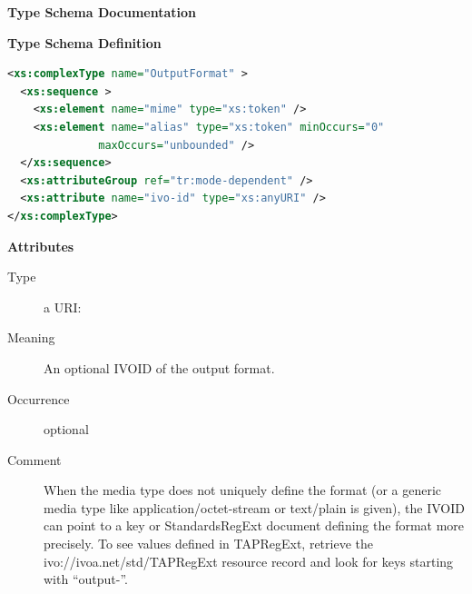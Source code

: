 \documentclass{ivoa}
\begin{document}
\begin{generated}
\begingroup
        \renewcommand*\descriptionlabel[1]{%
        \hbox to 5.5em{\emph{#1}\hfil}}\vspace{2ex}\noindent\textbf{ Type Schema Documentation}



\vspace{1ex}\noindent\textbf{ Type Schema Definition}

\begin{lstlisting}[language=XML,basicstyle=\footnotesize]
<xs:complexType name="OutputFormat" >
  <xs:sequence >
    <xs:element name="mime" type="xs:token" />
    <xs:element name="alias" type="xs:token" minOccurs="0"
              maxOccurs="unbounded" />
  </xs:sequence>
  <xs:attributeGroup ref="tr:mode-dependent" />
  <xs:attribute name="ivo-id" type="xs:anyURI" />
</xs:complexType>
\end{lstlisting}

\vspace{0.5ex}\noindent\textbf{ Attributes}

\begingroup\small\begin{bigdescription}
\item[ivo-id]
\begin{description}
\item[Type] a URI: 
\item[Meaning] An optional IVOID of the output format.
\item[Occurrence] optional
\item[Comment] When the media type does not uniquely define the
          format (or a generic media type like application/octet-stream or
          text/plain is given), the IVOID can point to a key
          or StandardsRegExt document defining the format more
          precisely.  To see values defined in TAPRegExt,
          retrieve the ivo://ivoa.net/std/TAPRegExt
          resource record and look for keys starting with “output-”.
\end{description}


\end{bigdescription}
\end{generated}
\end{document}

